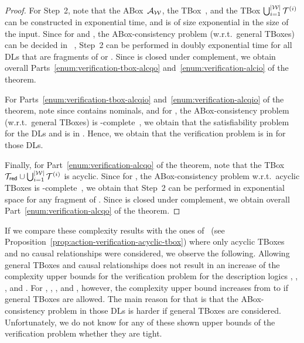 \begin{proof}
    For Step~2, note that the ABox~$\mathcal{A}_\mathcal{W}$, the TBox~\Tred, and the TBox
    $\bigcup_{i=1}^{\lvert\mathcal{W}\rvert}\mathcal{T}^{(i)}$ can be constructed in
    exponential time, and is of size exponential in the size of the input.
    Since for \ALCIO and \ALCQO, the ABox-consistency problem (w.r.t.\ general
    TBoxes) can be decided in
    \ExpTime~\cite{Sch-DKE94,Hla-DPIJCAR04,HoSa-IJCAI01}, Step~2 can be
    performed in doubly exponential time for all DLs that are fragments of
    \ALCIO or \ALCQO.  Since \ExpTime is closed under complement, we obtain
    overall Parts~\ref{enum:verification-tbox-alcqo}
    and~\ref{enum:verification-alcio} of the theorem.

    For Parts~\ref{enum:verification-tbox-alcqio}
    and~\ref{enum:verification-alcqio} of the theorem, note since \Tred contains
    nominals, and for \ALCQIO, the ABox-consistency problem (w.r.t.\ general
    TBoxes) is \NExpTime-complete~\cite{Sch-DKE94,Tob-JAIR00,Pra-JLLI05}, we
    obtain that the satisfiability problem for the DLs \ALCQI and \ALCQIO is in
    \TwoNExpTime.  Hence, we obtain that the verification problem is in
    \coTwoNExpTime for those DLs.

    Finally, for Part~\ref{enum:verification-alcqo} of the theorem, note that
    the TBox $\mathcal{T}_\mathsf{red}\cup\bigcup_{i=1}^{\lvert\mathcal{W}\rvert}\mathcal{T}^{(i)}$ is acyclic.
    Since for \ALCQO, the ABox-consistency problem w.r.t.\ acyclic TBoxes is
    \PSpace-complete~\cite{Sch-DKE94,BLM+-LTCS-05-02}, we obtain that Step~2 can
    be performed in exponential space for any fragment of \ALCQO.  Since
    \ExpSpace is closed under complement, we obtain overall
    Part~\ref{enum:verification-alcqo} of the theorem.
\end{proof}

\noindent
If we compare these complexity results with the ones
of~\cite{BaLM-ECAI10} (see
Proposition~\ref{prop:action-verification-acyclic-tbox}) where only acyclic
TBoxes and no causal relationships were considered, we observe the following.
Allowing general TBoxes and causal relationships does not result in an increase
of the complexity upper bounds for the verification problem for the description
logics \ALCI, \ALCIO, \ALCQI, and \ALCQIO.  For \ALC, \ALCO, \ALCQ, and \ALCQO,
however, the complexity upper bound increases from \ExpSpace to \TwoExpTime if
general TBoxes are allowed.  The main reason for that is that the
ABox-consistency problem in those DLs is harder if general TBoxes are
considered.
%
Unfortunately, we do not know for any of these shown upper bounds of the
verification problem whether they are tight.


